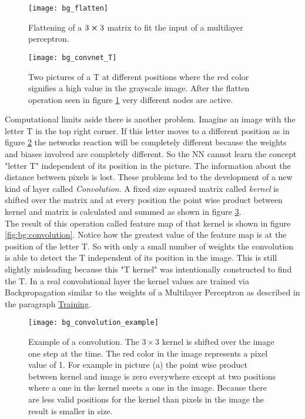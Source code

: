 \begin{figure}[H]
    \centering
    \texttt{[image: bg\_flatten]}
    \caption{Flattening of a $3\cp3$ matrix to fit the input of a multilayer perceptron.}
    \label{fig:bg:flatten}
\end{figure}

\begin{figure}[H]
    \centering
    \texttt{[image: bg\_convnet\_T]}
    \caption{Two pictures of a T at different positions where the red color signifies a high value in the grayscale image. After the flatten operation seen in figure \ref{fig:bg:flatten} very different nodes are active.}
    \label{fig:bg:convnet_T}
\end{figure}

\indent
Computational limits aside there is another problem. Imagine an image with the letter T in the top right corner. If this letter moves to a different position as in figure \ref{fig:bg:convnet_T} the networks reaction will be completely different because the weights and biases involved are completely different. So the NN cannot learn the concept "letter T" independent of its position in the picture. The information about the distance between pixels is lost.
These problems led to the development of a new kind of layer called \textit{Convolution}. A fixed size squared matrix called \textit{kernel} is shifted over the matrix and at every position the point wise product between kernel and matrix is calculated and summed as shown in figure \ref{fig:bg:conv_examp}.
\\

\indent
The result of this operation called feature map of that kernel is shown in figure \ref{fig:bg:convolution}. Notice how the greatest value of the feature map is at the position of the letter T. So with only a small number of weights the convolution is able to detect the T independent of its position in the image.
This is still slightly misleading because this "T kernel" was intentionally constructed to find the T. In a real convolutional layer the kernel values are trained via Backpropagation similar to the weights of a Multilayer Perceptron as described in the paragraph \hyperref[par:training]{Training}.
\\

\begin{figure}[H]
    \centering
    \texttt{[image: bg\_convolution\_example]}
    \caption{Example of a convolution. The $3 \times 3$ kernel is shifted over the image one step at the time. The red color in the image represents a pixel value of 1. For example in picture (a) the point wise product between kernel and image is zero everywhere except at two positions where a one in the kernel meets a one in the image. Because there are less valid positions for the kernel than pixels in the image the result is smaller in size.}
    \label{fig:bg:conv_examp}
\end{figure}


